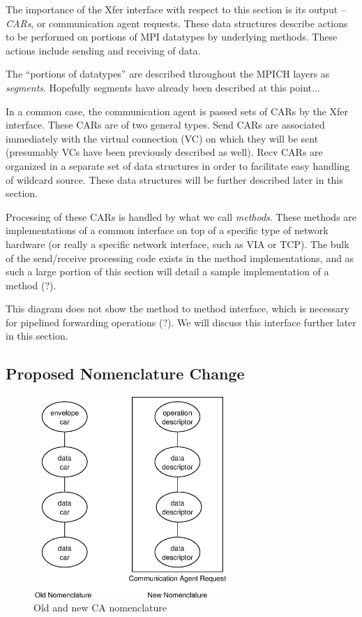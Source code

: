 \documentclass[11pt,letterpaper]{article}
\begin{document}
The importance of the Xfer interface with respect to this section is its output
-- \emph{CARs}, or communication agent requests.  These data structures
describe actions to be performed on portions of MPI datatypes by underlying
methods.  These actions include sending and receiving of data.

The ``portions of datatypes'' are described throughout the MPICH layers as
\emph{segments}.  Hopefully segments have already been described at this
point...

In a common case, the communication agent is passed sets of CARs by the Xfer
interface.  These CARs are of two general types.  Send CARs are associated
immediately with the virtual connection (VC) on which they will be sent
(presumably VCs have been previously described as well).  Recv CARs are
organized in a separate set of data structures in order to facilitate easy
handling of wildcard source.  These data structures will be further described
later in this section.

Processing of these CARs is handled by what we call \emph{methods}.  These
methods are implementations of a common interface on top of a specific type of
network hardware (or really a specific network interface, such as VIA or TCP).
The bulk of the send/receive processing code exists in the method
implementations, and as such a large portion of this section will detail a
sample implementation of a method (?).

This diagram does not show the method to method interface, which is necessary
for pipelined forwarding operations (?).  We will discuss this interface
further later in this section.

\subsection{Proposed Nomenclature Change}

\begin{figure}
\begin{center}
\includegraphics[height=3in]{ca-nomenclature.eps}
\caption{\label{fig:ca-nomenclature} Old and new CA nomenclature}
\end{center}
\end{figure}
\end{document}
